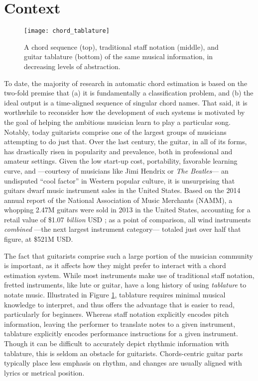 \section{Context}
\label{sec:context}


\begin{figure}[t!]

  \centering
  \centerline{\texttt{[image: chord\_tablature]}}
\caption{A chord sequence (top), traditional staff notation (middle), and guitar tablature (bottom) of the same musical information, in decreasing levels of abstraction.}
\label{fig:chord_notation}
%
\end{figure}

To date, the majority of research in automatic chord estimation is based on the two-fold premise that (a) it is fundamentally a classification problem, and (b) the ideal output is a time-aligned sequence of singular chord names.
That said, it is worthwhile to reconsider how the development of such systems is motivated by the goal of helping the ambitious musician learn to play a particular song.
Notably, today guitarists comprise one of the largest groups of musicians attempting to do just that.
Over the last century, the guitar, in all of its forms, has drastically risen in popularity and prevalence, both in professional and amateur settings.
Given the low start-up cost, portability, favorable learning curve, and ---courtesy of musicians like Jimi Hendrix or \emph{The Beatles}--- an undisputed ``cool factor'' in Western popular culture, it is unsurprising that guitars dwarf music instrument sales in the United States.
Based on the 2014 annual report of the National Association of Music Merchants (NAMM), a whopping 2.47M guitars were sold in 2013 in the United States, accounting for a retail value of \$1.07 \emph{billion} USD \cite{NAMM2014Global}; as a point of comparison, all wind instruments \emph{combined} ---the next largest instrument category--- totaled just over half that figure, at \$521M USD.

The fact that guitarists comprise such a large portion of the musician community is important, as it affects how they might prefer to interact with a chord estimation system.
While most instruments make use of traditional staff notation, fretted instruments, like lute or guitar, have a long history of using \emph{tablature} to notate music.
Illustrated in Figure \ref{fig:chord_notation}, tablature requires minimal musical knowledge to interpret, and thus offers the advantage that is easier to read, particularly for beginners.
Whereas staff notation explicitly encodes pitch information, leaving the performer to translate notes to a given instrument, tablature explicitly encodes performance instructions for a given instrument.
Though it can be difficult to accurately depict rhythmic information with tablature, this is seldom an obstacle for guitarists.
Chords-centric guitar parts typically place less emphasis on rhythm, and changes are usually aligned with lyrics or metrical position.

